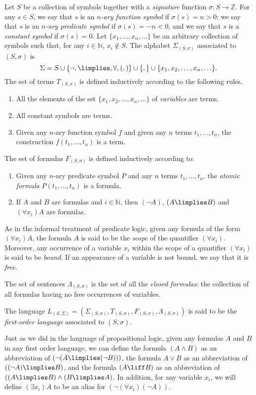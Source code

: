 \begin{definition}
Let $S$ be a collection of symbols together with a \emph{signature} function $\sigma : S \longrightarrow \mathbb{Z}$. For any $s\in S$, we say that $s$ is an \emph{$n$-ary function symbol} if $\sigma(s) = n > 0$; we say that $s$ is an \emph{$n$-ary predicate symbol} if $\sigma(s) = -n < 0$, and we say that $s$ is a \emph{constant symbol} if $\sigma(s) = 0$.
Let $\{x_1,\ldots,x_n,\ldots\}$ be an arbitrary collection of symbols such that, for any $i\in\mathbb{N}$, $x_i\not\in S$.
The alphabet $\Sigma_{(S,\sigma)}$ associated to $(S,\sigma)$ is 
\[\Sigma = S\cup \{\lnot,\limplies,\forall,(,)\} \cup \{,\} \cup \{x_1,x_2,\ldots,x_n,\ldots\}.\]
The set of terms $T_{(S,\sigma)}$ is defined inductively according to the following rules.
\begin{enumerate}
\item All the elements of the set $\{x_1,x_2,\ldots,x_n,\ldots\}$ of \emph{variables} are terms.
\item All constant symbols are terms.
\item Given any $n$-ary function symbol $f$ and given any $n$ terms $t_1,\ldots,t_n$, the construction $f(t_1,\ldots,t_n)$ is a term.
\end{enumerate}
The set of formulas $F_{(S,\sigma)}$ is defined inductively according to:
\begin{enumerate}
\item Given any $n$-ary predicate symbol $P$ and any $n$ terms $t_1,\ldots,t_n$, the \emph{atomic formula} $P(t_1,\ldots,t_n)$ is a formula.
\item If $A$ and $B$ are formulas and $i\in\mathbb{N}$, then $(\lnot A)$, $(A\limplies B)$ and $(\forall x_i) A$ are formulas.
\end{enumerate}

As in the informal treatment of predicate logic, given any formula of the form $(\forall x_i) A$, the formula $A$ is said to be the \emph{scope} of the quantifier $(\forall x_i)$.
Moreover, any occurrence of a variable $x_i$ within the scope of a quantifier $(\forall x_i)$ is said to be \emph{bound}.
If an appearance of a variable is not bound, we say that it is \emph{free}.

The set of sentences $\Lambda_{(S,\sigma)}$ is the set of all the \emph{closed formulas}: the collection of all formulas having no free occurrences of variables.

The language $L_{(S,\Sigma)} = (\Sigma_{(S,\sigma)}, T_{(S,\sigma)}, F_{(S,\sigma)}, \Lambda_{(S,\sigma)})$ is said to be the \emph{first-order language} associated to $(S,\sigma)$. 

Just as we did in the language of propositional logic, given any formulas $A$ and $B$ in any first order language, we can define the formula $(A\land B)$ as an abbreviation of $(\lnot(A\limplies (\lnot B)))$, the formula $A\lor B$ as an abbreviation of $((\lnot A )\limplies B)$, and the formula $(A\liff B)$ as an abbreviation of $((A\limplies B) \land (B\limplies A)$.
In addition, for any variable $x_i$, we will define $(\exists x_i) A$ to be an alias for $(\lnot(\forall x_i)(\lnot A))$.
\end{definition}

